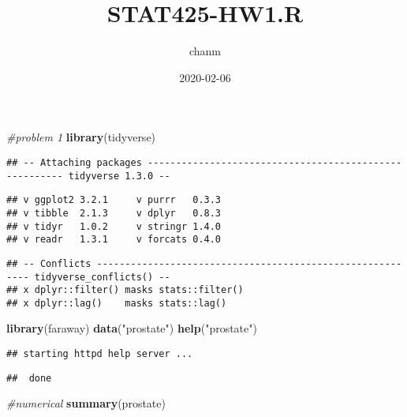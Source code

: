 \documentclass[]{article}
\title{STAT425-HW1.R}
\author{chanm}
\date{2020-02-06}
\newenvironment{Shaded}{\begin{snugshade}}{\end{snugshade}}
\newcommand{\KeywordTok}[1]{\textcolor[rgb]{0.13,0.29,0.53}{\textbf{#1}}}
\newcommand{\StringTok}[1]{\textcolor[rgb]{0.31,0.60,0.02}{#1}}
\newcommand{\CommentTok}[1]{\textcolor[rgb]{0.56,0.35,0.01}{\textit{#1}}}
\newcommand{\NormalTok}[1]{#1}
\begin{document}
\maketitle

\begin{Shaded}
\begin{Highlighting}[]
\CommentTok{#problem 1}
\KeywordTok{library}\NormalTok{(tidyverse)}
\end{Highlighting}
\end{Shaded}

\begin{verbatim}
## -- Attaching packages ------------------------------------------------------- tidyverse 1.3.0 --
\end{verbatim}

\begin{verbatim}
## v ggplot2 3.2.1     v purrr   0.3.3
## v tibble  2.1.3     v dplyr   0.8.3
## v tidyr   1.0.2     v stringr 1.4.0
## v readr   1.3.1     v forcats 0.4.0
\end{verbatim}

\begin{verbatim}
## -- Conflicts ---------------------------------------------------------- tidyverse_conflicts() --
## x dplyr::filter() masks stats::filter()
## x dplyr::lag()    masks stats::lag()
\end{verbatim}

\begin{Shaded}
\begin{Highlighting}[]
\KeywordTok{library}\NormalTok{(faraway)}
\KeywordTok{data}\NormalTok{(}\StringTok{"prostate"}\NormalTok{)}
\KeywordTok{help}\NormalTok{(}\StringTok{"prostate"}\NormalTok{)}
\end{Highlighting}
\end{Shaded}

\begin{verbatim}
## starting httpd help server ...
\end{verbatim}

\begin{verbatim}
##  done
\end{verbatim}

\begin{Shaded}
\begin{Highlighting}[]
\CommentTok{#numerical}
\KeywordTok{summary}\NormalTok{(prostate)}
\end{Highlighting}
\end{Shaded}
\end{document}
